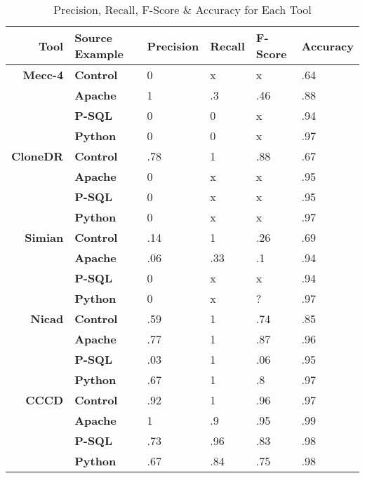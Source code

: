 \documentclass[smallextended]{svjour3}       %
\begin{document}
\begin{table}[thb!]

\begin{center}
\caption{Precision, Recall, F-Score \& Accuracy for Each Tool}
\label{Table:Allprecisionrecall}
\begin{tabular}{r||l|l|l|l|l}
\bfseries Tool & \bfseries Source Example & \bfseries Precision & \bfseries Recall & \bfseries F-Score & \bfseries Accuracy \\ \hline\hline
  \bfseries Mecc-4 & \bfseries Control & 0 & x & x & .64  \\ \cline{2-6}
& \bfseries Apache & 1 & .3 & .46 & .88 \\ \cline{2-6}
& \bfseries P-SQL & 0 & 0 & x & .94 \\ \cline{2-6}
& \bfseries Python & 0 & 0 & x & .97 \\ \cline{2-6}
 \hline \hline
  \bfseries CloneDR & \bfseries Control & .78 & 1 & .88 & .67   \\ \cline{2-6} %
& \bfseries Apache & 0 & x & x & .95 \\ \cline{2-6}
& \bfseries P-SQL & 0 & x & x & .95 \\ \cline{2-6}
& \bfseries Python & 0 & x & x & .97 \\ \cline{2-6}
 \hline \hline
  \bfseries Simian & \bfseries Control & .14 & 1 & .26 & .69   \\ \cline{2-6}
& \bfseries Apache & .06 & .33 & .1 & .94 \\ \cline{2-6}
& \bfseries P-SQL & 0 & x & x & .94 \\ \cline{2-6}
& \bfseries Python & 0 & x & ? & .97 \\ \cline{2-6}
 \hline \hline
  \bfseries Nicad & \bfseries Control & .59 & 1 & .74 & .85   \\ \cline{2-6}
& \bfseries Apache & .77 & 1 & .87 & .96 \\ \cline{2-6}
& \bfseries P-SQL & .03 & 1 & .06 & .95 \\ \cline{2-6}
& \bfseries Python & .67 & 1 & .8 & .97 \\ \cline{2-6}
 \hline \hline
  \bfseries CCCD & \bfseries Control & .92 & 1 & .96 & .97   \\ \cline{2-6}
& \bfseries Apache & 1 & .9 & .95 & .99 \\ \cline{2-6}
& \bfseries P-SQL & .73 & .96 & .83 & .98 \\ \cline{2-6}
& \bfseries Python & .67 & .84 & .75 & .98 \\ \cline{2-6}
 \hline %

\end{tabular}

\end{center}

\end{table}
\end{document}
